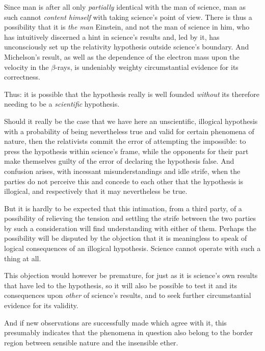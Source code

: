 \documentclass[12pt,a4paper]{article}
\begin{document}
Since man is after all only \emph{partially} identical with the man of
science, man as such cannot \emph{content himself} with taking science's point
of view. There is thus a possibility that it is \emph{the man} Einstein, and
not the man of science in him, who has intuitively discerned a hint in
science's results and, led by it, has unconsciously set up the relativity
hypothesis outside science's boundary. And Michelson's result, as well as the
dependence of the electron mass upon the velocity in the $\beta$-rays, is
undeniably weighty circumstantial evidence for its correctness.

Thus: it is possible that the hypothesis really is well founded \emph{without}
its therefore needing to be a \emph{scientific} hypothesis.

\bigskip

Should it really be the case that we have here an unscientific, illogical
hypothesis with a probability of being nevertheless true and valid for certain
phenomena of nature, then the relativists commit the error of attempting the
impossible: to press the hypothesis within science's frame, while the
opponents for their part make themselves guilty of the error of declaring the
hypothesis false. And confusion arises, with incessant misunderstandings and
idle strife, when the parties do not perceive this and concede to each other
that the hypothesis is illogical, and respectively that it may nevertheless be
true.

But it is hardly to be expected that this intimation, from a third party, of a
possibility of relieving the tension and settling the strife between the two
parties by such a consideration will find understanding with either of them.
Perhaps the possibility will be disputed by the objection that it is
meaningless to speak of logical consequences of an illogical hypothesis.
Science cannot operate with such a thing at all.

This objection would however be premature, for just as it is science's own
results that have led to the hypothesis, so it will also be possible to test
it and its consequences upon \emph{other} of science's results, and to seek
further circumstantial evidence for its validity.

And if new observations are successfully made which agree with it, this
presumably indicates that the phenomena in question also belong to the border
region between sensible nature and the insensible ether.

\bigskip
\end{document}
